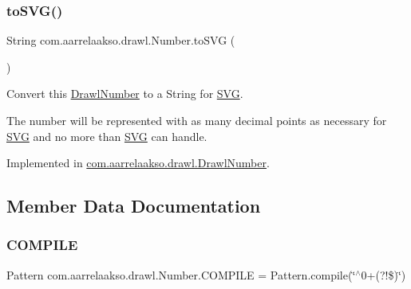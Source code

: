 \mbox{\label{interfacecom_1_1aarrelaakso_1_1drawl_1_1_number_a1cb9c85b621dc2669b2f52a4e82bdd3c}} 
\subsubsection{\texorpdfstring{to\+S\+V\+G()}{toSVG()}}
{\footnotesize\ttfamily String com.\+aarrelaakso.\+drawl.\+Number.\+to\+S\+VG (\begin{DoxyParamCaption}{ }\end{DoxyParamCaption})}



Convert this \hyperlink{classcom_1_1aarrelaakso_1_1drawl_1_1_drawl_number}{Drawl\+Number} to a String for \hyperlink{classcom_1_1aarrelaakso_1_1drawl_1_1_s_v_g}{S\+VG}. 

The number will be represented with as many decimal points as necessary for \hyperlink{classcom_1_1aarrelaakso_1_1drawl_1_1_s_v_g}{S\+VG} and no more than \hyperlink{classcom_1_1aarrelaakso_1_1drawl_1_1_s_v_g}{S\+VG} can handle. 

Implemented in \hyperlink{classcom_1_1aarrelaakso_1_1drawl_1_1_drawl_number_a63169b633e2d9807b56379238f5acaa0}{com.\+aarrelaakso.\+drawl.\+Drawl\+Number}.



\subsection{Member Data Documentation}
\mbox{\label{interfacecom_1_1aarrelaakso_1_1drawl_1_1_number_ad6cff21beec53c9eb5d47ee035e67aa7}} 
\subsubsection{\texorpdfstring{C\+O\+M\+P\+I\+LE}{COMPILE}}
{\footnotesize\ttfamily Pattern com.\+aarrelaakso.\+drawl.\+Number.\+C\+O\+M\+P\+I\+LE = Pattern.\+compile(\char`\"{}$^\wedge$0+(?!\$)\char`\"{})}

